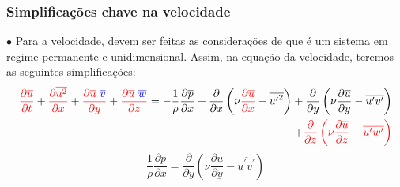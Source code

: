 \documentclass[xcolor=dvipsnames,10pt,aspectratio=169]{beamer}
\begin{document}
		
		
		\begin{frame}
			\frametitle{Simplificações chave na velocidade}
			$\bullet$ Para a velocidade, devem ser feitas as considerações de que é um sistema em regime permanente e unidimensional.
			Assim, na equação da velocidade, teremos as seguintes simplificações:
			\begin{equation}
			\begin{split}
			\color{red}\frac{\partial \overline{u}}{\partial t} \color{black}+\color{red} \frac{\partial \overline{u^2}}{\partial x} \color{black}+\color{red} \frac{\partial \overline{u} \ \color{blue}\overline{v}\color{red}}{\partial y}\color{black} + \color{red} \frac{\partial \overline{u} \ \color{blue}\overline{w}\color{red}}{\partial z} \color{black} =  - \frac{1}{\rho} \frac{\partial \overline{{p}}}{\partial x} + \frac{\partial}{\partial x} \left( \nu \color{red}\frac{\partial \overline{u}}{\partial x} \color{black} - \overline{{u^\prime}^2}\right) + \frac{\partial}{\partial y} \left( \nu \frac{\partial \overline{u}}{\partial y} - \overline{{u^\prime  v^\prime}}\right) \\
			+ \color{red}\frac{\partial}{\partial z} \left( \nu  \frac{\partial \overline{u}}{\partial z} - \overline{ u ^\prime w ^\prime} \right) \color{black}
			\end{split}
			\end{equation}
			\begin{equation}
			\frac{1}{\rho} \frac{\partial \overline{p}}{\partial x} = \frac{\partial}{\partial y} \left( \nu \frac{\partial \overline{u}}{\partial y} - \overline{u^\prime v^\prime}\right)  
			\end{equation}
		\end{frame}
		
		
		
		
		
\end{document}
